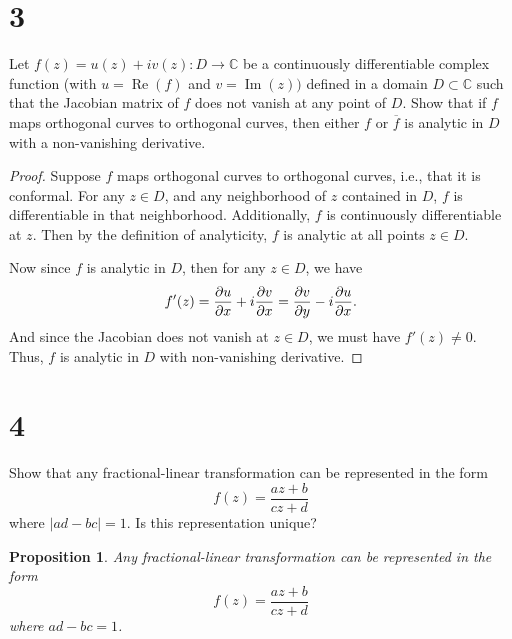 \documentclass[12pt]{article}
\newtheorem{proposition}{Proposition}
\newenvironment{problem}
    {\begin{lrbox}{\mybox}\begin{minipage}{0.98\textwidth}}
    {\end{minipage}\end{lrbox}\framebox[\textwidth]{\usebox{\mybox}}}
\newcommand{\C}{\mathbb{C}} %
\newcommand{\<}{\left\langle} %
\renewcommand{\>}{\right\rangle} %
\renewcommand{\Im}{\operatorname{Im}} %
\renewcommand{\Re}{\operatorname{Re}} %
\newcommand{\pdv}[3][1]{\ifnum#1=1{\frac{\partial #2}{\partial#3}}\else{\frac{\partial^{#1}#2}{\partial#3^{#1}}}\fi} %
\let\conj\overline %
\begin{document}
\newpage
\section*{3}
\begin{problem}
    Let $f(z) = u(z) + iv(z): D \to \C$ be a continuously differentiable complex function (with $u = \Re(f)$ and $v = \Im(z))$ defined in a domain $D \subset \C$ such that the Jacobian matrix of $f$ does not vanish at any point of $D$. Show that if $f$ maps orthogonal curves to orthogonal curves, then either $f$ or $\conj{f}$ is analytic in $D$ with a non-vanishing derivative.
\end{problem}

\begin{proof}
    Suppose $f$ maps orthogonal curves to orthogonal curves, i.e., that it is conformal. For any $z\in D$, and any neighborhood of $z$ contained in $D$, $f$ is differentiable in that neighborhood. Additionally, $f$ is continuously differentiable at $z$. Then by the definition of analyticity, $f$ is analytic at all points $z\in D$. 
    
    Now since $f$ is analytic in $D$, then for any $z\in D$, we have
    \[f'(z) = \pdv{u}{x} + i \pdv{v}{x} = \pdv{v}{y} - i \pdv{u}{x}.\]
    And since the Jacobian does not vanish at $z\in D$, we must have $f'(z)\ne0$. Thus, $f$ is analytic in $D$ with non-vanishing derivative.
    
\end{proof}

\newpage
\section*{4}
\begin{problem}
    Show that any fractional-linear transformation can be represented in the form
    \[f(z) = \frac{az+b}{cz+d}\]
    where $|ad - bc| = 1$. Is this representation unique?
\end{problem}

\begin{proposition}
    Any fractional-linear transformation can be represented in the form
    \[f(z) = \frac{az+b}{cz+d}\]
    where $ad - bc = 1$.
\end{proposition}
\end{document}
